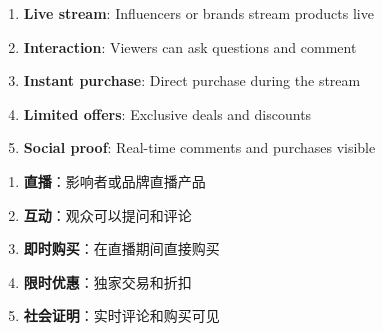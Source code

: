 \begin{enumerate}
    \item \textbf{Live stream}: Influencers or brands stream products live
    \item \textbf{Interaction}: Viewers can ask questions and comment
    \item \textbf{Instant purchase}: Direct purchase during the stream
    \item \textbf{Limited offers}: Exclusive deals and discounts
    \item \textbf{Social proof}: Real-time comments and purchases visible
\end{enumerate}

\begin{enumerate}
    \item \textbf{直播}：影响者或品牌直播产品
    \item \textbf{互动}：观众可以提问和评论
    \item \textbf{即时购买}：在直播期间直接购买
    \item \textbf{限时优惠}：独家交易和折扣
    \item \textbf{社会证明}：实时评论和购买可见
\end{enumerate}

